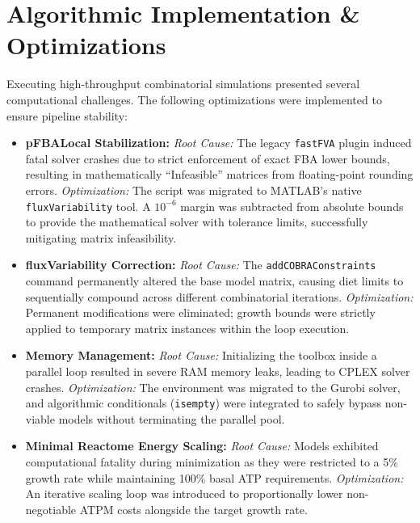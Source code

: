 \documentclass[11pt, a4paper]{article}
\begin{document}
\section{Algorithmic Implementation \& Optimizations}
Executing high-throughput combinatorial simulations presented several computational challenges. The following optimizations were implemented to ensure pipeline stability:

\begin{itemize}[itemsep=2pt, parsep=0pt]
    \item \textbf{pFBALocal Stabilization:} 
    \textit{Root Cause:} The legacy \texttt{fastFVA} plugin induced fatal solver crashes due to strict enforcement of exact FBA lower bounds, resulting in mathematically ``Infeasible'' matrices from floating-point rounding errors. 
    \textit{Optimization:} The script was migrated to MATLAB's native \texttt{fluxVariability} tool. A $10^{-6}$ margin was subtracted from absolute bounds to provide the mathematical solver with tolerance limits, successfully mitigating matrix infeasibility.

    \item \textbf{fluxVariability Correction:} 
    \textit{Root Cause:} The \texttt{addCOBRAConstraints} command permanently altered the base model matrix, causing diet limits to sequentially compound across different combinatorial iterations. 
    \textit{Optimization:} Permanent modifications were eliminated; growth bounds were strictly applied to temporary matrix instances within the loop execution.

    \item \textbf{Memory Management:} 
    \textit{Root Cause:} Initializing the toolbox inside a parallel loop resulted in severe RAM memory leaks, leading to CPLEX solver crashes. 
    \textit{Optimization:} The environment was migrated to the Gurobi solver, and algorithmic conditionals (\texttt{isempty}) were integrated to safely bypass non-viable models without terminating the parallel pool.

    \item \textbf{Minimal Reactome Energy Scaling:} 
    \textit{Root Cause:} Models exhibited computational fatality during minimization as they were restricted to a 5\% growth rate while maintaining 100\% basal ATP requirements. 
    \textit{Optimization:} An iterative scaling loop was introduced to proportionally lower non-negotiable ATPM costs alongside the target growth rate.
\end{itemize}
\end{document}
